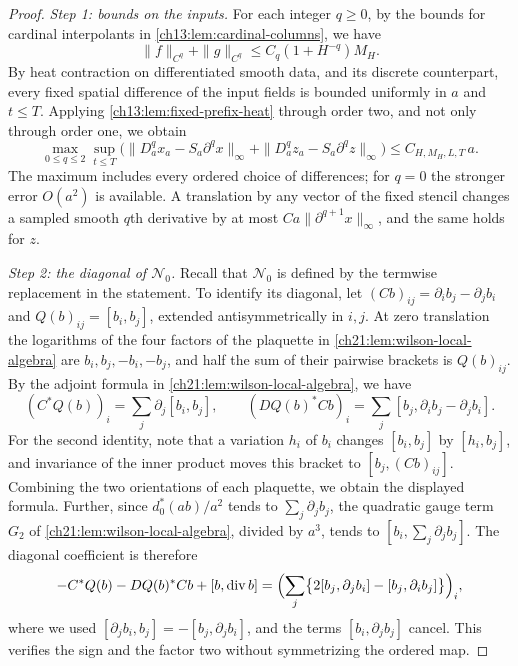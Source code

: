 \begin{proof}
\emph{Step 1: bounds on the inputs.} For each integer $q\ge0$, by the bounds for cardinal interpolants in \cref{ch13:lem:cardinal-columns}, we have
\[
 \|f\|_{C^q}+\|g\|_{C^q}\le C_q(1+H^{-q})M_H .
\]
By heat contraction on differentiated smooth data, and its discrete counterpart, every fixed spatial difference of the input fields is bounded uniformly in $a$ and $t\le T$. Applying \cref{ch13:lem:fixed-prefix-heat} through order two, and not only through order one, we obtain
\begin{equation}\label{ch22:eq:prefix-two-differences}
 \max_{0\le q\le2}\sup_{t\le T}
 \bigl(\|D_a^qx_a-S_a\partial^qx\|_\infty+\|D_a^qz_a-S_a\partial^qz\|_\infty\bigr)\le C_{H,M_H,L,T}\,a .
\end{equation}
The maximum includes every ordered choice of differences; for $q=0$ the stronger error $O(a^2)$ is available. A translation by any vector of the fixed stencil changes a sampled smooth $q$th derivative by at most $Ca\|\partial^{q+1}x\|_\infty$, and the same holds for $z$.

\emph{Step 2: the diagonal of $\mathcal N_0$.} Recall that $\mathcal N_0$ is defined by the termwise replacement in the statement. To identify its diagonal, let $(Cb)_{ij}=\partial_ib_j-\partial_jb_i$ and $Q(b)_{ij}=[b_i,b_j]$, extended antisymmetrically in $i,j$. At zero translation the logarithms of the four factors of the plaquette in \cref{ch21:lem:wilson-local-algebra} are $b_i,b_j,-b_i,-b_j$, and half the sum of their pairwise brackets is $Q(b)_{ij}$. By the adjoint formula in \cref{ch21:lem:wilson-local-algebra}, we have
\[
 (C^*Q(b))_i=\sum_j\partial_j[b_i,b_j],\qquad
 (DQ(b)^*Cb)_i=\sum_j[b_j,\partial_ib_j-\partial_jb_i].
\]
For the second identity, note that a variation $h_i$ of $b_i$ changes $[b_i,b_j]$ by $[h_i,b_j]$, and invariance of the inner product moves this bracket to $[b_j,(Cb)_{ij}]$. Combining the two orientations of each plaquette, we obtain the displayed formula. Further, since $d_0^*(ab)/a^2$ tends to $\sum_j\partial_jb_j$, the quadratic gauge term $G_2$ of \cref{ch21:lem:wilson-local-algebra}, divided by $a^3$, tends to $[b_i,\sum_j\partial_jb_j]$. The diagonal coefficient is therefore
\[
 -C^*Q(b)-DQ(b)^*Cb+[b,\operatorname{div}b]
 =\Bigl(\sum_j\bigl\{2[b_j,\partial_jb_i]-[b_j,\partial_ib_j]\bigr\}\Bigr)_i,
\]
where we used $[\partial_jb_i,b_j]=-[b_j,\partial_jb_i]$, and the terms $[b_i,\partial_jb_j]$ cancel. This verifies the sign and the factor two without symmetrizing the ordered map.


\end{proof}
